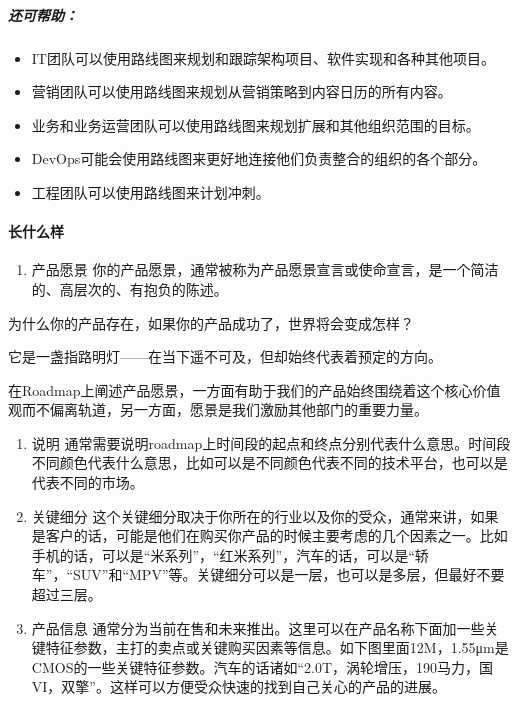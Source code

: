 \documentclass[letterpaper,11pt,english]{sphinxmanual}
\begin{document}
\subparagraph{还可帮助：}
\label{\detokenize{chapter_project/Roadmap:id3}}\begin{itemize}
\item {} 
IT团队可以使用路线图来规划和跟踪架构项目、软件实现和各种其他项目。

\item {} 
营销团队可以使用路线图来规划从营销策略到内容日历的所有内容。

\item {} 
业务和业务运营团队可以使用路线图来规划扩展和其他组织范围的目标。

\item {} 
DevOps可能会使用路线图来更好地连接他们负责整合的组织的各个部分。

\item {} 
工程团队可以使用路线图来计划冲刺。

\end{itemize}


\paragraph{长什么样}
\label{\detokenize{chapter_project/Roadmap:id4}}\begin{enumerate}
%
\item {} 
产品愿景
你的产品愿景，通常被称为产品愿景宣言或使命宣言，是一个简洁的、高层次的、有抱负的陈述。

\end{enumerate}

为什么你的产品存在，如果你的产品成功了，世界将会变成怎样？

它是一盏指路明灯——在当下遥不可及，但却始终代表着预定的方向。

在Roadmap上阐述产品愿景，一方面有助于我们的产品始终围绕着这个核心价值观而不偏离轨道，另一方面，愿景是我们激励其他部门的重要力量。
\begin{enumerate}
%
\setcounter{enumi}{1}
\item {} 
说明
通常需要说明roadmap上时间段的起点和终点分别代表什么意思。时间段不同颜色代表什么意思，比如可以是不同颜色代表不同的技术平台，也可以是代表不同的市场。

\item {} 
关键细分
这个关键细分取决于你所在的行业以及你的受众，通常来讲，如果是客户的话，可能是他们在购买你产品的时候主要考虑的几个因素之一。比如手机的话，可以是“米系列”，“红米系列”，汽车的话，可以是“轿车”，“SUV”和“MPV”等。关键细分可以是一层，也可以是多层，但最好不要超过三层。

\item {} 
产品信息
通常分为当前在售和未来推出。这里可以在产品名称下面加一些关键特征参数，主打的卖点或关键购买因素等信息。如下图里面12M，1.55μm是CMOS的一些关键特征参数。汽车的话诸如“2.0T，涡轮增压，190马力，国VI，双擎”。这样可以方便受众快速的找到自己关心的产品的进展。

\end{enumerate}
\end{document}
